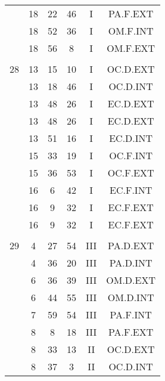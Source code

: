 \documentclass[12pt, a4paper]{article}
\begin{document}
\begin{multicols}{3}
{\begin{tabular}{c c c c c c}
	 	 	 	 & 18 & 22 & 46 & I & PA.F.EXT\\%
	 	 	 	 & 18 & 52 & 36 & I & OM.F.INT\\%
	 	 	 	 & 18 & 56 & 8 & I & OM.F.EXT\\%
	 	 	 	 & & & & & \\%
	 	 	 	28 & 13 & 15 & 10 & I & OC.D.EXT\\%
	 	 	 	 & 13 & 18 & 46 & I & OC.D.INT\\%
	 	 	 	 & 13 & 48 & 26 & I & EC.D.EXT\\%
	 	 	 	 & 13 & 48 & 26 & I & EC.D.EXT\\%
	 	 	 	 & 13 & 51 & 16 & I & EC.D.INT\\%
	 	 	 	 & 15 & 33 & 19 & I & OC.F.INT\\%
	 	 	 	 & 15 & 36 & 53 & I & OC.F.EXT\\%
	 	 	 	 & 16 & 6 & 42 & I & EC.F.INT\\%
	 	 	 	 & 16 & 9 & 32 & I & EC.F.EXT\\%
	 	 	 	 & 16 & 9 & 32 & I & EC.F.EXT\\%
	 	 	 	 & & & & & \\%
	 	 	 	29 & 4 & 27 & 54 & III & PA.D.EXT\\%
	 	 	 	 & 4 & 36 & 20 & III & PA.D.INT\\%
	 	 	 	 & 6 & 36 & 39 & III & OM.D.EXT\\%
	 	 	 	 & 6 & 44 & 55 & III & OM.D.INT\\%
	 	 	 	 & 7 & 59 & 54 & III & PA.F.INT\\%
	 	 	 	 & 8 & 8 & 18 & III & PA.F.EXT\\%
	 	 	 	 & 8 & 33 & 13 & II & OC.D.EXT\\%
	 	 	 	 & 8 & 37 & 3 & II & OC.D.INT\\%

\end{tabular}}
\end{multicols}
\end{document}
